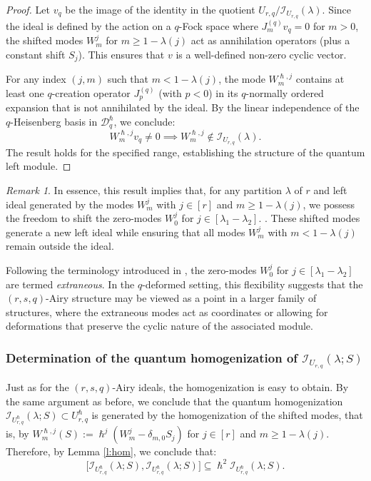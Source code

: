 \documentclass[reqno,11pt]{amsart}
\theoremstyle{plain}
\theoremstyle{definition}
\theoremstyle{remark}
\newtheorem{remark}[theorem]{Remark}
\numberwithin{equation}{section}
\newcommand{\1}{\mathds{1}}
\newcommand{\2}{\frac{1}{2}}
\begin{document}
{\begin{proof}
					{Let $v_q$ be the image of the identity in the quotient $U_{r,q}/ \mathcal{I}_{U_{r,q}}(\lambda)$. Since the ideal is defined by the action on a $q$-Fock space where $J^{(q)}_m v_q = 0$ for $m > 0$, the shifted modes $W^j_m$ for $m \geq 1 - \lambda(j)$ act as annihilation operators (plus a constant shift $S_j$). This ensures that $v$ is a well-defined non-zero cyclic vector.}
					
					
					{For any index $(j, m)$ such that $m < 1 - \lambda(j)$, the mode $W^{\hslash, j}_m$ contains at least one $q$-creation operator $J^{(q)}_p$ (with $p < 0$) in its $q$-normally ordered expansion that is not annihilated by the ideal. By the linear independence of the $q$-Heisenberg basis in $\mathcal{D}_q^\hslash$, we conclude:
						\begin{equation}
							W^{\hslash, j}_m v_q \neq 0 \implies W^{\hslash, j}_m \notin \mathcal{I}_{U_{r,q}}(\lambda).
						\end{equation}
						The result holds for the specified range, establishing the structure of the quantum left module.}
				\end{proof}
				\begin{remark}
					In essence, this result implies that, for any partition  $\lambda$ of $r$ and left ideal generated by the modes $W^j_m$ with $j \in [r]$ and $m \geq 1 - \lambda(j)$, we  possess the freedom to shift the zero-modes $W^j_0$ for $j \in [\lambda_1-\lambda_2]$. . These shifted modes generate a new left ideal while ensuring that all modes  $W^j_m$ with $m < 1 - \lambda(j)$ remain outside the ideal.
					
					Following the terminology introduced in \cite{BBCC21}, the zero-modes $W^j_0$ for $ j \in [\lambda_1-\lambda_2]$ are termed  \emph{extraneous}. In the $q$-deformed setting, this flexibility suggests that the $(r,s,q)$-Airy structure may be viewed as a point in a larger family of structures, where the extraneous modes act as coordinates or  allowing for deformations that preserve the cyclic nature of the associated module.
				\end{remark}
				\subsubsection{Determination of the quantum  homogenization of $\mathcal{I}_{U_{r,q}}(\lambda;S)$}
				Just as for the $(r,s,q)$-Airy ideals, the homogenization is easy to obtain. By the same argument as before, we conclude that the quantum homogenization  $\mathcal{I}_{U^\hslash_{r,q}}(\lambda;S) \subset U^\hslash_{r,q}$ is generated by the homogenization of the shifted modes, that is, by $W^{\hslash,j}_m(S) := \hslash^j (W^j_m- \delta_{m,0} S_j)$ for $j \in [r]$ and $m \geq  1-\lambda(j)$. Therefore, by Lemma \ref{l:hom}, we conclude that:
				\begin{equation}
					\big[ \mathcal{I}_{U_{r,q}^\hslash}(\lambda;S), \mathcal{I}_{U_{r,q}^\hslash}(\lambda;S)\big] \subseteq \hslash^2 \mathcal{I}_{U_{r,q}^\hslash}(\lambda;S).
				\end{equation}
}
\end{document}
